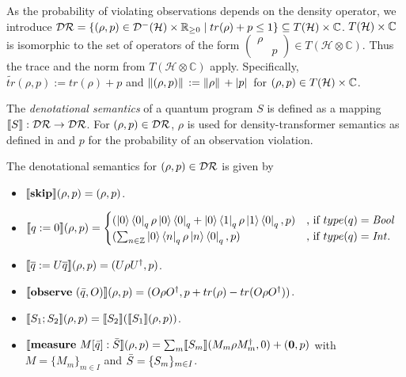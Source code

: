\documentclass[a4paper,UKenglish,cleveref, autoref, thm-restate]{lipics-v2021}
\begin{document}
As the probability of violating observations depends on the density operator, we introduce $\mathcal{D}\mathcal{R} = \{(\rho,p) \in \mathcal{D}^- (\mathcal{H}) \times \mathbb{R}_{\geq 0} \mid tr(\rho) +p \leq 1\} \subseteq T(\mathcal{H}) \times \mathbb{C}$. $T(\mathcal{H}) \times \mathbb{C}$ is isomorphic to the set of operators of the form $\begin{pmatrix}
    \rho & \\
     & p
\end{pmatrix} \in T(\mathcal{H}\otimes \mathbb{C})$. Thus the trace and the norm from $T(\mathcal{H}\otimes \mathbb{C})$ apply. Specifically, $\tilde{tr}(\rho,p):= tr(\rho) +p$ and $\norm*{(\rho,p)} := \norm*{\rho} + \abs*{p}$ for $(\rho,p)\in T(\mathcal{H}) \times \mathbb{C}$.
\begin{definition}
     The \emph{denotational semantics} of a quantum program $S$ is defined as a mapping $\llbracket S \rrbracket:\mathcal{D}\mathcal{R} \to \mathcal{D}\mathcal{R}$. For $(\rho,p)\in \mathcal{D}\mathcal{R}$, $\rho$ is used for density-transformer semantics as defined in \cite{floydHoareLogic} and $p$ for the probability of an observation violation.

The denotational semantics for $(\rho,p) \in \mathcal{D}\mathcal{R}$ is given by
\begin{itemize}
    \item $\llbracket \mathbf{skip} \rrbracket (\rho ,p)= (\rho,p)$.

    \item $\llbracket q:=0  \rrbracket (\rho,p )= \begin{cases}
        (\ket{0} \bra{0}_q \rho \ket{0}\bra{0}_q+\ket{0} \bra{1}_q\rho \ket{1} \bra{0}_q,p) &\text{, if } type(q)=\mathit{Bool}\\
        (\sum_{n\in \mathbb{Z}} \ket{0} \bra{n}_q \rho \ket{n} \bra{0}_q,p)  &\text{, if } type(q)=\mathit{Int}.
        \end{cases}$

    \item $\llbracket \overline{q}:= U\overline{q} \rrbracket (\rho,p )=(U\rho U^\dagger ,p)$.

    \item $\llbracket \mathbf{observe } \text{ }(\Bar{q},O) \rrbracket (\rho,p)
    = (O \rho O^\dagger,p+ tr(\rho)-tr(O\rho O^\dagger) )$.

    \item $\llbracket S_1;S_2 \rrbracket (\rho,p )= \llbracket S_2 \rrbracket (\llbracket S_1 \rrbracket (\rho,p ) ) $.

    \item $\llbracket \mathbf{measure } \text{ }M[\Bar{q}]:\Bar{S}  \rrbracket(\rho ,p)= \sum_m \llbracket S_m  \rrbracket (M_m \rho M_m ^\dagger ,0) + (\mathbf{0},p)$ with $M=\{M_m\}_{m \in I}$ and $\Bar{S}=\{S_m\}_{m\in I}$.


\end{itemize}
\end{definition}
\end{document}
